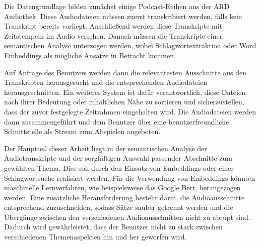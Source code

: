 Die Datengrundlage bilden zunächst einige Podcast-Reihen aus der ARD Audiothek. Diese Audiodateien müssen zuerst transkribiert werden, falls kein Transkript bereits vorliegt. Anschließend werden diese Transkripte mit Zeitstempeln im Audio versehen. Danach müssen die Transkripte einer semantischen Analyse unterzogen werden, wobei Schlagwortextraktion oder Word Embeddings als mögliche Ansätze in Betracht kommen.

Auf Anfrage des Benutzers werden dann die relevantesten Ausschnitte aus den Transkripten herausgesucht und die entsprechenden Audiodateien herausgeschnitten. Ein weiteres System ist dafür verantwortlich, diese Dateien nach ihrer Bedeutung oder inhaltlichen Nähe zu sortieren und sicherzustellen, dass der zuvor festgelegte Zeitrahmen eingehalten wird. Die Audiodateien werden dann zusammengeführt und dem Benutzer über eine benutzerfreundliche Schnittstelle als Stream zum Abspielen angeboten.

Der Hauptteil dieser Arbeit liegt in der semantischen Analyse der Audiotranskripte und der sorgfältigen Auswahl passender Abschnitte zum gewählten Thema. Dies soll durch den Einsatz von Embeddings oder einer Schlagwortsuche realisiert werden. Für die Verwendung von Embeddings könnten maschinelle Lernverfahren, wie beispielsweise das Google Bert, herangezogen werden. Eine zusätzliche Herausforderung besteht darin, die Audioausschnitte entsprechend zuzuschneiden, sodass Sätze sauber getrennt werden und die Übergänge zwischen den verschiedenen Audioausschnitten nicht zu abrupt sind. Dadurch wird gewährleistet, dass der Benutzer nicht zu stark zwischen verschiedenen Themenaspekten hin und her geworfen wird.

\cite{barthel}
\cite{choi2018}
\cite{clark2020}
\cite{du2017}
\cite{jones2021}
\cite{kang2012}
~\cite{karpukhin2020}
\cite{laban2022}
\cite{lochrie2018}
\cite{maroni2020}
\cite{moldovan2000}
\cite{zhang2020}
\cite{oord2017}
